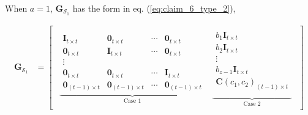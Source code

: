 \documentclass[journal,twocolumn]{IEEEtran}
\theoremstyle{definition}
\newcommand{\calS}{\mathcal{S}}
\newcommand{\bfG}{\mathbf{G}}
\newcommand{\bfI}{\mathbf{I}}
\newcommand{\bfC}{\mathbf{C}}
\newcommand{\bfzr}{\mathbf{0}}
\begin{document}
\begin{itemize}
	When $a=1$, $\bfG_{\calS_1}$ has the form in eq. (\ref{eq:claim_6_type_2}),
		\begin{table*}[t]
	\begin{align}
		\bfG_{\calS_1}&=
		\begin{bmatrix}
		\begin{array}{cc}
		\underbrace{\begin{array}{cccc}
			\bfI_{t\times t}&\bfzr_{t\times t}&\cdots&\bfzr_{t\times t}\\
			\bfzr_{t\times t}&\bfI_{t\times t}&\cdots&\bfzr_{t\times t}\\
			\vdots&&&\\
			\bfzr_{t\times t}&\bfzr_{t\times t}&\cdots&\bfI_{t\times t}\\
			\bfzr_{(t-1)\times t}&\bfzr_{(t-1)\times t}&\cdots&\bfzr_{(t-1)\times t}
			\end{array}
			}_{\text{Case 1}}&
		\underbrace{\begin{array}{c}
			{b_1}\bfI_{t\times t}\\
			{b_2}\bfI_{t\times t}\\
			\vdots\\
			{b_{z-1}}\bfI_{t\times t}\\
			\bfC(c_1, c_2)_{(t-1)\times t}\\
			\end{array}
		}_{\text{Case 2}}
		\end{array}
				\end{bmatrix}
        \label{eq:claim_6_type_2}
	\end{align}
\end{table*}
	

\end{itemize}
\end{document}
